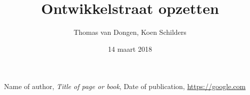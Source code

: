 \documentclass[12pt]{article}
\title{Ontwikkelstraat opzetten}
\author{Thomas van Dongen, Koen Schilders}
\date{14 maart 2018}
\begin{document}
\begin{titlepage}
\maketitle
\end{titlepage}

\begin{thebibliography}{9}
	Name of author,
	\textit{Title of page or book},
	Date of publication,
	\url{https://google.com}
\end{thebibliography}
\end{document}
